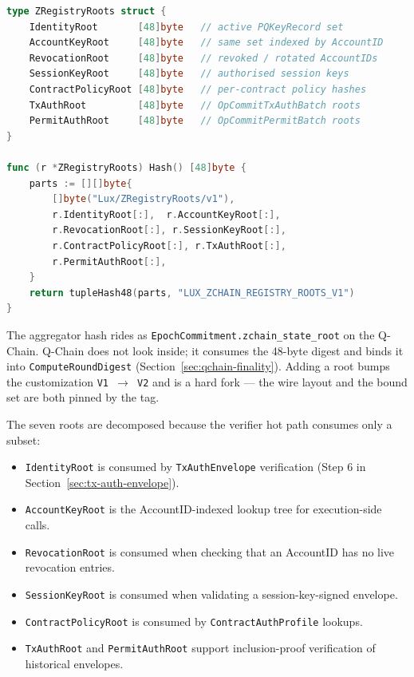\begin{lstlisting}[language=Go,caption={ZRegistryRoots aggregator. Source:
\texttt{protocol/zchain/registry/roots.go:40}.}]
type ZRegistryRoots struct {
    IdentityRoot       [48]byte   // active PQKeyRecord set
    AccountKeyRoot     [48]byte   // same set indexed by AccountID
    RevocationRoot     [48]byte   // revoked / rotated AccountIDs
    SessionKeyRoot     [48]byte   // authorised session keys
    ContractPolicyRoot [48]byte   // per-contract policy hashes
    TxAuthRoot         [48]byte   // OpCommitTxAuthBatch roots
    PermitAuthRoot     [48]byte   // OpCommitPermitBatch roots
}

func (r *ZRegistryRoots) Hash() [48]byte {
    parts := [][]byte{
        []byte("Lux/ZRegistryRoots/v1"),
        r.IdentityRoot[:],  r.AccountKeyRoot[:],
        r.RevocationRoot[:], r.SessionKeyRoot[:],
        r.ContractPolicyRoot[:], r.TxAuthRoot[:],
        r.PermitAuthRoot[:],
    }
    return tupleHash48(parts, "LUX_ZCHAIN_REGISTRY_ROOTS_V1")
}
\end{lstlisting}

The aggregator hash rides as \texttt{EpochCommitment.zchain\_state\_root} on
the Q-Chain. Q-Chain does not look inside; it consumes the 48-byte digest
and binds it into \texttt{ComputeRoundDigest}
(Section~\ref{sec:qchain-finality}). Adding a root bumps the customization
\texttt{V1 $\to$ V2} and is a hard fork --- the wire layout and the bound
set are both pinned by the tag.

The seven roots are decomposed because the verifier hot path consumes only
a subset:

\begin{itemize}[leftmargin=2em,nosep]
  \item \texttt{IdentityRoot} is consumed by \texttt{TxAuthEnvelope}
    verification (Step 6 in Section~\ref{sec:tx-auth-envelope}).
  \item \texttt{AccountKeyRoot} is the AccountID-indexed lookup tree for
    execution-side calls.
  \item \texttt{RevocationRoot} is consumed when checking that an
    AccountID has no live revocation entries.
  \item \texttt{SessionKeyRoot} is consumed when validating a
    session-key-signed envelope.
  \item \texttt{ContractPolicyRoot} is consumed by
    \texttt{ContractAuthProfile} lookups.
  \item \texttt{TxAuthRoot} and \texttt{PermitAuthRoot} support
    inclusion-proof verification of historical envelopes.
\end{itemize}

